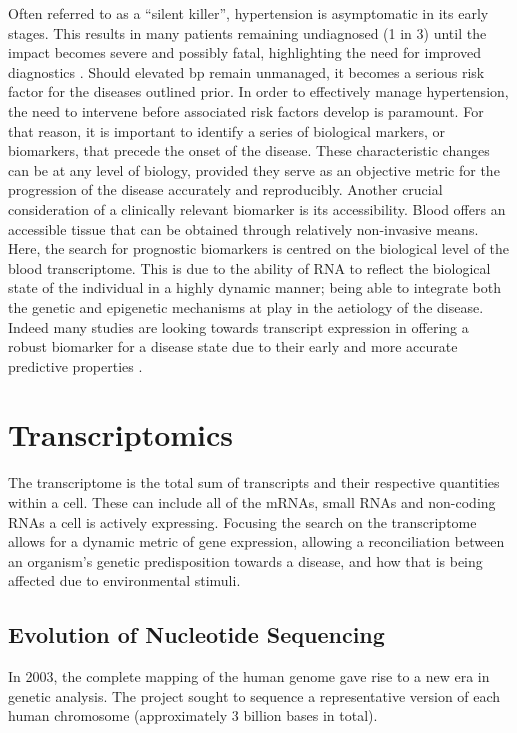 Often referred to as a “silent killer”, hypertension is asymptomatic in its early stages. This results in many patients remaining undiagnosed (1 in 3) until the impact becomes severe and possibly fatal, highlighting the need for improved diagnostics \cite{PHE2013}. Should elevated \acrshort{bp} remain unmanaged, it becomes a serious risk factor for the diseases outlined prior. In order to effectively manage hypertension, the need to intervene before associated risk factors develop is paramount. For that reason, it is important to identify a series of biological markers, or biomarkers, that precede the onset of the disease. These characteristic changes can be at any level of biology, provided they serve as an objective metric for the progression of the disease accurately and reproducibly. Another crucial consideration of a clinically relevant biomarker is its accessibility. Blood offers an accessible tissue that can be obtained through relatively non-invasive means. Here, the search for prognostic biomarkers is centred on the biological level of the blood transcriptome. This is due to the ability of RNA to reflect the biological state of the individual in a highly dynamic manner; being able to integrate both the genetic and epigenetic mechanisms at play in the aetiology of the disease. Indeed many studies are looking towards transcript expression in offering a robust biomarker for a disease state due to their early and more accurate predictive properties \cite{Sunde2010,Bazzell2018,10.1093/sleep/zsy186}. 

\section{Transcriptomics}

The transcriptome is the total sum of transcripts and their respective quantities within a cell. These can include all of the mRNAs, small RNAs and non-coding RNAs a cell is actively expressing. 
Focusing the search on the transcriptome allows for a dynamic metric of gene expression, allowing a reconciliation between an organism’s genetic predisposition towards a disease, and how that is being affected due to environmental stimuli. 

\subsection{Evolution of Nucleotide Sequencing}

In 2003, the complete mapping of the human genome gave rise to a new era in genetic analysis. The project sought to sequence a representative version of each human chromosome (approximately 3 billion bases in total). 

